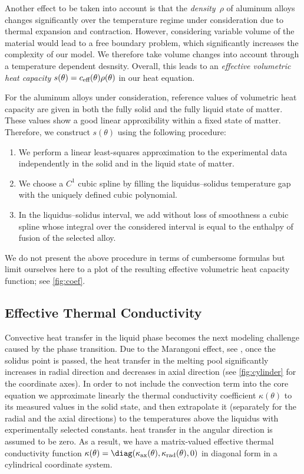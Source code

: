 Another effect to be taken into account is that the \emph{density}~$\rho$ of aluminum alloys changes significantly over the temperature regime under consideration due to thermal expansion and contraction.
However, considering variable volume of the material would lead to a free boundary problem, which significantly increases the complexity of our model.
We therefore take volume changes into account through a temperature dependent desnsity.
Overall, this leads to an \emph{effective volumetric heat capacity} $s(\theta) = c_\textup{eff}(\theta) \rho(\theta)$ in our heat equation.

For the aluminum alloys under consideration, reference values of volumetric heat capacity are given in both the fully solid and the fully liquid state of matter. 
These values show a good linear approxibility within a fixed state of matter. 
Therefore, we construct $s(\theta)$ using the following procedure:
\begin{enumerate}
	\item 
		We perform a linear least-squares approximation to the experimental data independently in the solid and in the liquid state of matter.
	\item 
		We choose a $C^1$ cubic spline by filling the liquidus--solidus temperature gap with the uniquely defined cubic polynomial.
	\item 
		In the liquidus--solidus interval, we add without loss of smoothness a cubic spline whose integral over the considered interval is equal to the enthalpy of fusion of the selected alloy.
\end{enumerate}

We do not present the above procedure in terms of cumbersome formulas but limit ourselves here to a plot of the resulting effective volumetric heat capacity function; see \cref{fig:coef}.


\subsection{Effective Thermal Conductivity}
\label{subsec:conductivity}

Convective heat transfer in the liquid phase becomes the next modeling challenge caused by the phase transition. 
Due to the Marangoni effect, see \cite{MillsKeeneBrooksShirali:1998:1,Saldi:2012:1}, once the solidus point is passed, the heat transfer in the melting pool significantly increases in radial direction and decreases in axial direction (see \cref{fig:cylinder} for the coordinate axes).
In order to not include the convection term into the core equation we approximate linearly the thermal conductivity coefficient $\kappa(\theta)$ to its measured values in the solid state, and then extrapolate it (separately for the radial and the axial directions) to the temperatures above the liquidus with experimentally selected constants. 
 heat transfer in the angular direction is assumed to be zero.
As a result, we have a matrix-valued effective thermal conductivity function $\kappa(\theta) = \diag(\kappa_\textup{ax}(\theta), \kappa_\textup{rad}(\theta), 0)$ in diagonal form in a cylindrical coordinate system.

